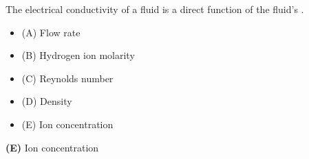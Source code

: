 

The electrical conductivity of a fluid is a direct function of the fluid's \underbar{\hskip 50pt}.

\begin{itemize}
\item{(A)} Flow rate
\vskip 5pt 
\item{(B)} Hydrogen ion molarity
\vskip 5pt 
\item{(C)} Reynolds number
\vskip 5pt 
\item{(D)} Density
\vskip 5pt 
\item{(E)} Ion concentration
\end{itemize}







{\bf (E)} Ion concentration
 









